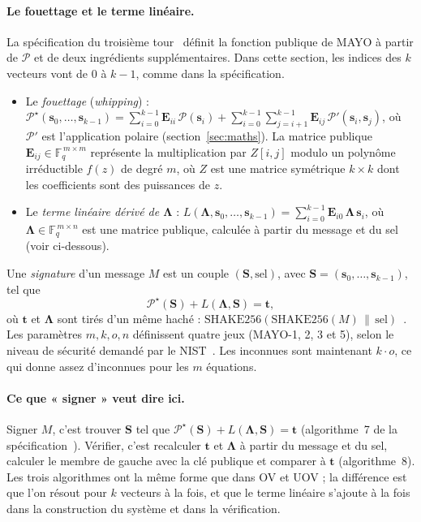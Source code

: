 \paragraph{Le fouettage et le terme linéaire.} La spécification du troisième tour~\cite{mayospec} définit la fonction publique de MAYO à partir de $\mathcal{P}$ et de deux ingrédients supplémentaires. Dans cette section, les indices des $k$ vecteurs vont de $0$ à $k-1$, comme dans la spécification.
\begin{itemize}[itemsep=1pt]
\item Le \emph{fouettage} (\emph{whipping}) : $\displaystyle\mathcal{P}^\star(\mathbf{s}_0,\dots,\mathbf{s}_{k-1})=\sum_{i=0}^{k-1}\mathbf{E}_{ii}\,\mathcal{P}(\mathbf{s}_i)+\sum_{i=0}^{k-1}\sum_{j=i+1}^{k-1}\mathbf{E}_{ij}\,\mathcal{P}'(\mathbf{s}_i,\mathbf{s}_j)$, où $\mathcal{P}'$ est l'application polaire (section~\ref{sec:maths}). La matrice publique $\mathbf{E}_{ij}\in\mathbb{F}_q^{\,m\times m}$ représente la multiplication par $Z[i,j]$ modulo un polynôme irréductible $f(z)$ de degré $m$, où $Z$ est une matrice symétrique $k\times k$ dont les coefficients sont des puissances de $z$.
\item Le \emph{terme linéaire dérivé de $\boldsymbol{\Lambda}$} : $\displaystyle L(\boldsymbol{\Lambda},\mathbf{s}_0,\dots,\mathbf{s}_{k-1})=\sum_{i=0}^{k-1}\mathbf{E}_{i0}\,\boldsymbol{\Lambda}\,\mathbf{s}_i$, où $\boldsymbol{\Lambda}\in\mathbb{F}_q^{\,m\times n}$ est une matrice publique, calculée à partir du message et du sel (voir ci-dessous).
\end{itemize}
Une \emph{signature} d'un message $M$ est un couple $(\mathbf{S},\text{sel})$, avec $\mathbf{S}=(\mathbf{s}_0,\dots,\mathbf{s}_{k-1})$, tel que
\[\mathcal{P}^\star(\mathbf{S})+L(\boldsymbol{\Lambda},\mathbf{S})=\mathbf{t},\]
où $\mathbf{t}$ et $\boldsymbol{\Lambda}$ sont tirés d'un même haché : $\mathrm{SHAKE256}(\mathrm{SHAKE256}(M)\,\|\,\text{sel})$~\cite{mayospec}. Les paramètres $m,k,o,n$ définissent quatre jeux (MAYO-1, 2, 3 et 5), selon le niveau de sécurité demandé par le NIST~\cite{nistadd}. Les inconnues sont maintenant $k\cdot o$, ce qui donne assez d'inconnues pour les $m$ équations.

\paragraph{Ce que « signer » veut dire ici.} Signer $M$, c'est trouver $\mathbf{S}$ tel que $\mathcal{P}^\star(\mathbf{S})+L(\boldsymbol{\Lambda},\mathbf{S})=\mathbf{t}$ (algorithme~7 de la spécification~\cite{mayospec}). Vérifier, c'est recalculer $\mathbf{t}$ et $\boldsymbol{\Lambda}$ à partir du message et du sel, calculer le membre de gauche avec la clé publique et comparer à $\mathbf{t}$ (algorithme~8). Les trois algorithmes ont la même forme que dans OV et UOV ; la différence est que l'on résout pour $k$ vecteurs à la fois, et que le terme linéaire s'ajoute à la fois dans la construction du système et dans la vérification.

